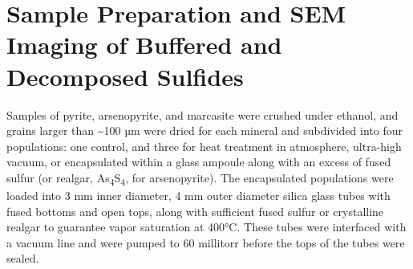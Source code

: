 %
%

\section{Sample Preparation and SEM Imaging of Buffered and Decomposed Sulfides}\label{sem-imaging-of-buffered-and-decomposed-sulfides}

Samples of pyrite, arsenopyrite, and marcasite were crushed under ethanol, and grains larger than \textasciitilde100 µm were dried for each mineral and subdivided into four populations: one control, and three for heat treatment in atmosphere, ultra-high vacuum, or encapsulated within a glass ampoule along with an excess of fused sulfur (or realgar, As\textsubscript{4}S\textsubscript{4}, for arsenopyrite). The encapsulated populations were loaded into 3 mm inner diameter, 4 mm outer diameter silica glass tubes with fused bottoms and open tops, along with sufficient fused sulfur or crystalline realgar to guarantee vapor saturation at 400°C. These tubes were interfaced with a vacuum line and were pumped to 60 millitorr before the tops of the tubes were sealed. 

